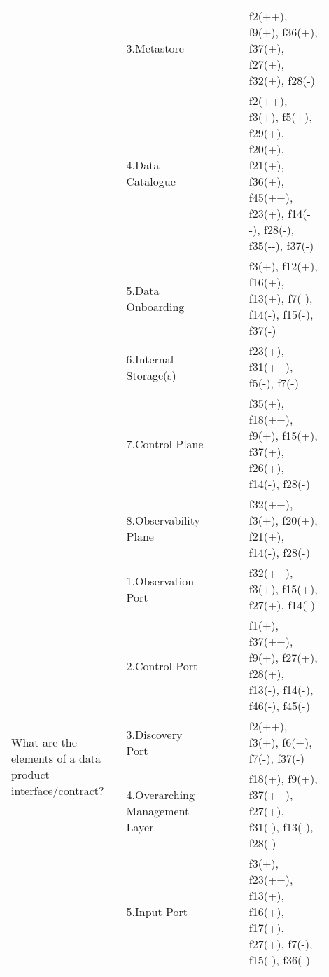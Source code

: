 \begin{tabular}{|p{0.12\linewidth}|p{0.015\linewidth}|p{0.3\linewidth}|p{0.15\linewidth}|p{0.31\linewidth}|}
 & \cellcolor{emerald_shape_7}{} & 3.Metastore&\cellcolor{emerald_shape_5}{s7, s20, s25, s31, s37, s38, s42, s43, s45, s49, s52, p1, p2, p4, p5, p6, p8} & f2(++), f9(+), f36(+), f37(+), f27(+), f32(+), f28(-)\\
 & \cellcolor{emerald_shape_7}{} & 4.Data Catalogue&\cellcolor{emerald_shape_6}{s1, s3, s5, s7, s9, s15, s16, s25, s30, s31, s32, s37, s43, s47, s48, s53, s55, p1, p3, p4, p5, p6, p7, p8, p9} & f2(++), f3(+), f5(+), f29(+), f20(+), f21(+), f36(+), f45(++), f23(+), f14(-{}-), f28(-), f35(-{}-), f37(-)\\
 & \cellcolor{emerald_shape_7}{} & 5.Data Onboarding&\cellcolor{emerald_shape_3}{s4, s5, s15, s30, s52, p1, p3} & f3(+), f12(+), f16(+), f13(+), f7(-), f14(-), f15(-), f37(-)\\
 & \cellcolor{emerald_shape_7}{} & 6.Internal Storage(s)&\cellcolor{emerald_shape_4}{s4, s13, s15, s32, s33, s36, s49, p1, p4, p7} & f23(+), f31(++), f5(-), f7(-)\\
 & \cellcolor{emerald_shape_7}{} & 7.Control Plane&\cellcolor{emerald_shape_2}{s49, s52, p1, p3} & f35(+), f18(++), f9(+), f15(+), f37(+), f26(+), f14(-), f28(-)\\
 & \multirow{-8}{\linewidth}{ \cellcolor{emerald_shape_7}{48}} &8.Observability Plane&\cellcolor{emerald_shape_3}{s3, s7, s11, s13, s22, s52, p3} & f32(++), f3(+), f20(+), f21(+), f14(-), f28(-)\\
\multirow{6}{\linewidth}{What are the elements of a data product interface/contract?} &\cellcolor{emerald_shape_6}{} &1.Observation Port&\cellcolor{emerald_shape_4}{s3, s7, s11, s13, s22, s52, p2, p3, p4, p6, p8} & f32(++), f3(+), f15(+), f27(+), f14(-)\\
 & \cellcolor{emerald_shape_6}{} & 2.Control Port&\cellcolor{emerald_shape_3}{s49, s52, p1, p2, p4, p6} & f1(+), f37(++), f9(+), f27(+), f28(+), f13(-), f14(-), f46(-), f45(-)\\
 & \cellcolor{emerald_shape_6}{} & 3.Discovery Port&\cellcolor{emerald_shape_4}{s20, s25, s49, s52, p3, p4, p8, p9} & f2(++), f3(+), f6(+), f7(-), f37(-)\\
 & \cellcolor{emerald_shape_6}{} & 4.Overarching Management Layer&\cellcolor{emerald_shape_3}{p1, p2, p6, p9} & f18(+), f9(+), f37(++), f27(+), f31(-), f13(-), f28(-)\\
 & \cellcolor{emerald_shape_6}{} & 5.Input Port&\cellcolor{emerald_shape_6}{s1, s2, s3, s7, s13, s14, s16, s23, s24, s27, s36, s40, s49, s52, s57, p2, p3, p4, p6, p8} & f3(+), f23(++), f13(+), f16(+), f17(+), f27(+), f7(-), f15(-), f36(-)\\

\end{tabular}
